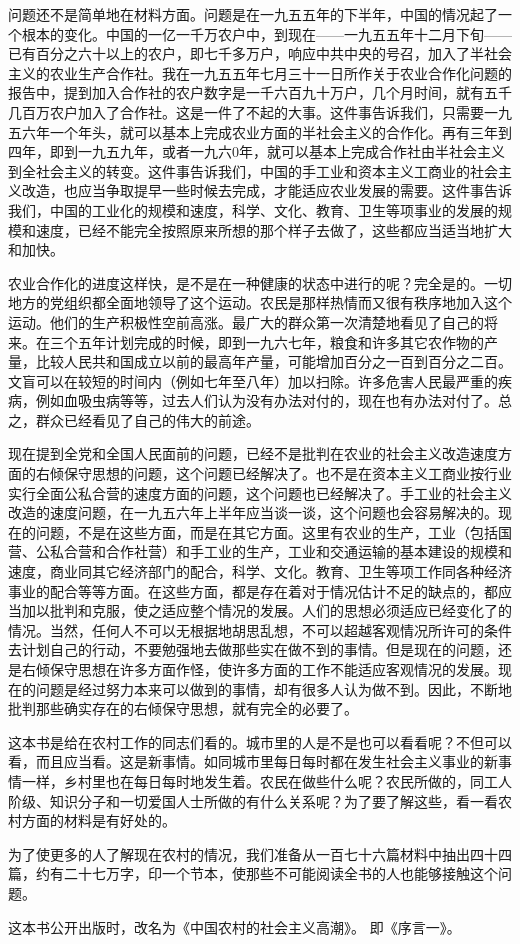 问题还不是简单地在材料方面。问题是在一九五五年的下半年，中国的情况起了一个根本的变化。中国的一亿一千万农户中，到现在——一九五五年十二月下旬——已有百分之六十以上的农户，即七千多万户，响应中共中央的号召，加入了半社会主义的农业生产合作社。我在一九五五年七月三十一日所作关于农业合作化问题的报告中，提到加入合作社的农户数字是一千六百九十万户，几个月时间，就有五千几百万农户加入了合作社。这是一件了不起的大事。这件事告诉我们，只需要一九五六年一个年头，就可以基本上完成农业方面的半社会主义的合作化。再有三年到四年，即到一九五九年，或者一九六0年，就可以基本上完成合作社由半社会主义到全社会主义的转变。这件事告诉我们，中国的手工业和资本主义工商业的社会主义改造，也应当争取提早一些时候去完成，才能适应农业发展的需要。这件事告诉我们，中国的工业化的规模和速度，科学、文化、教育、卫生等项事业的发展的规模和速度，已经不能完全按照原来所想的那个样子去做了，这些都应当适当地扩大和加快。

农业合作化的进度这样快，是不是在一种健康的状态中进行的呢？完全是的。一切地方的党组织都全面地领导了这个运动。农民是那样热情而又很有秩序地加入这个运动。他们的生产积极性空前高涨。最广大的群众第一次清楚地看见了自己的将来。在三个五年计划完成的时候，即到一九六七年，粮食和许多其它农作物的产量，比较人民共和国成立以前的最高年产量，可能增加百分之一百到百分之二百。文盲可以在较短的时间内（例如七年至八年）加以扫除。许多危害人民最严重的疾病，例如血吸虫病等等，过去人们认为没有办法对付的，现在也有办法对付了。总之，群众已经看见了自己的伟大的前途。

现在提到全党和全国人民面前的问题，已经不是批判在农业的社会主义改造速度方面的右倾保守思想的问题，这个问题已经解决了。也不是在资本主义工商业按行业实行全面公私合营的速度方面的问题，这个问题也已经解决了。手工业的社会主义改造的速度问题，在一九五六年上半年应当谈一谈，这个问题也会容易解决的。现在的问题，不是在这些方面，而是在其它方面。这里有农业的生产，工业（包括国营、公私合营和合作社营）和手工业的生产，工业和交通运输的基本建设的规模和速度，商业同其它经济部门的配合，科学、文化。教育、卫生等项工作同各种经济事业的配合等等方面。在这些方面，都是存在着对于情况估计不足的缺点的，都应当加以批判和克服，使之适应整个情况的发展。人们的思想必须适应已经变化了的情况。当然，任何人不可以无根据地胡思乱想，不可以超越客观情况所许可的条件去计划自己的行动，不要勉强地去做那些实在做不到的事情。但是现在的问题，还是右倾保守思想在许多方面作怪，使许多方面的工作不能适应客观情况的发展。现在的问题是经过努力本来可以做到的事情，却有很多人认为做不到。因此，不断地批判那些确实存在的右倾保守思想，就有完全的必要了。

这本书是给在农村工作的同志们看的。城市里的人是不是也可以看看呢？不但可以看，而且应当看。这是新事情。如同城市里每日每时都在发生社会主义事业的新事情一样，乡村里也在每日每时地发生着。农民在做些什么呢？农民所做的，同工人阶级、知识分子和一切爱国人士所做的有什么关系呢？为了要了解这些，看一看农村方面的材料是有好处的。

为了使更多的人了解现在农村的情况，我们准备从一百七十六篇材料中抽出四十四篇，约有二十七万字，印一个节本，使那些不可能阅读全书的人也能够接触这个问题。


\begin{maonote}
这本书公开出版时，改名为《中国农村的社会主义高潮》。
即《序言一》。
\end{maonote}
